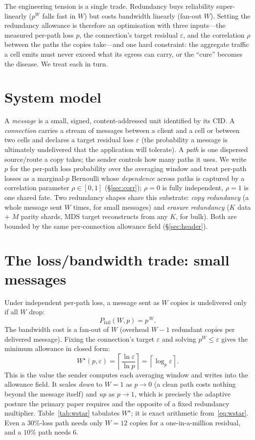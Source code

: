 \documentclass[10pt,twocolumn]{article}
\newcommand{\Wstar}{W^{\star}}
\begin{document}
The engineering tension is a single trade. Redundancy buys reliability
super-linearly ($p^{W}$ falls fast in $W$) but costs bandwidth linearly (fan-out
$W$). Setting the redundancy allowance is therefore an optimisation with three
inputs---the measured per-path loss $p$, the connection's target residual
$\varepsilon$, and the correlation $\rho$ between the paths the copies take---and
one hard constraint: the aggregate traffic a cell emits must never exceed what
its egress can carry, or the ``cure'' becomes the disease. We treat each in turn.

\section{System model}
A \emph{message} is a small, signed, content-addressed unit identified by its
CID. A \emph{connection} carries a stream of messages between a client and a cell
or between two cells and declares a target residual loss $\varepsilon$ (the
probability a message is ultimately undelivered that the application will
tolerate). A \emph{path} is one dispersed source/route a copy takes; the sender
controls how many paths it uses. We write $p$ for the per-path loss probability
over the averaging window and treat per-path losses as a marginal-$p$ Bernoulli
whose \emph{dependence} across paths is captured by a correlation parameter
$\rho\in[0,1]$ (\S\ref{sec:corr}); $\rho=0$ is fully independent, $\rho=1$ is one
shared fate. Two redundancy shapes share this substrate: \emph{copy redundancy}
(a whole message sent $W$ times, for small messages) and \emph{erasure
redundancy} ($K$ data $+$ $M$ parity shards, MDS target reconstructs from any
$K$, for
bulk). Both are bounded by the same per-connection allowance field
(\S\ref{sec:header}).

\section{The loss/bandwidth trade: small messages}\label{sec:trade}
Under independent per-path loss, a message sent as $W$ copies is undelivered only
if all $W$ drop:
\begin{equation}
  P_{\text{fail}}(W,p) = p^{\,W}. \label{eq:pw}
\end{equation}
The bandwidth cost is a fan-out of $W$ (overhead $W-1$ redundant copies per
delivered message). Fixing the connection's target $\varepsilon$ and solving
$p^{W}\le\varepsilon$ gives the minimum allowance in closed form:
\begin{equation}
  \Wstar(p,\varepsilon)=\left\lceil\frac{\ln\varepsilon}{\ln p}\right\rceil
   =\left\lceil\log_{p}\varepsilon\right\rceil. \label{eq:wstar}
\end{equation}
This is the value the sender computes each averaging window and writes into the
allowance field. It scales \emph{down} to $W=1$ as $p\to0$ (a clean path costs
nothing beyond the message itself) and \emph{up} as $p\to1$, which is precisely
the adaptive posture the primary paper requires and the opposite of a fixed
redundancy multiplier. Table~\ref{tab:wstar} tabulates $\Wstar$; it is exact
arithmetic from~\eqref{eq:wstar}. Even a $30\%$-loss path needs only
$W{=}12$ copies for a one-in-a-million residual, and a $10\%$ path needs $6$.
\end{document}
